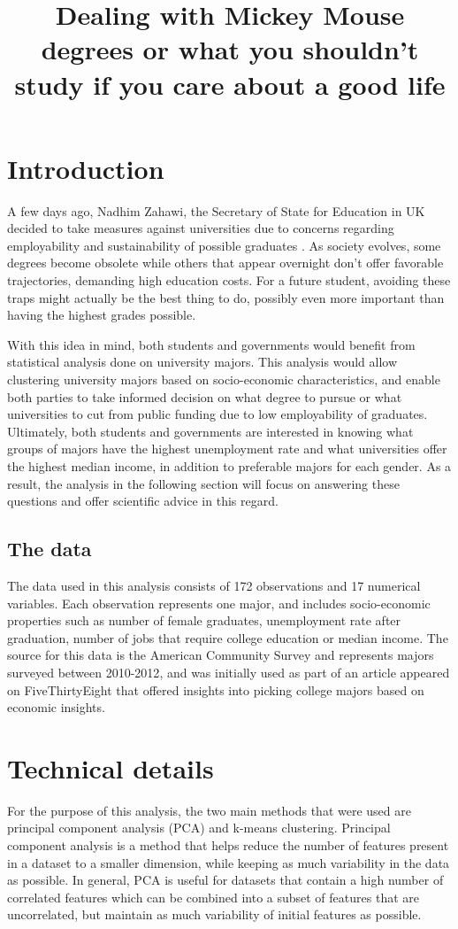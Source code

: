 \documentclass[11pt]{article}
\date{}
\title{Dealing with Mickey Mouse degrees or what you shouldn't study if you care about a good life}
\begin{document}
\newpage
\maketitle

\section*{Introduction}
A few days ago, Nadhim Zahawi, the Secretary of State for Education in UK decided to take measures against universities due to concerns regarding employability and sustainability of possible graduates \cite{dailymail}. As society evolves, some degrees become obsolete while others that appear overnight don't offer favorable trajectories, demanding high education costs. For a future student, avoiding these traps might actually be the best thing to do, possibly even more important than having the highest grades possible. 

With this idea in mind, both students and governments would benefit from statistical analysis done on university majors. This analysis would allow clustering university majors based on socio-economic characteristics, and enable both parties to take informed decision on what degree to pursue or what universities to cut from public funding due to low employability of graduates. Ultimately, both students and governments are interested in knowing what groups of majors have the highest unemployment rate and what universities offer the highest median income, in addition to preferable majors for each gender. As a result, the analysis in the following section will focus on answering these questions and offer scientific advice in this regard.

\subsection*{The data}
The data used in this analysis consists of 172 observations and 17 numerical variables. Each observation represents one major, and includes socio-economic properties such as number of female graduates, unemployment rate after graduation, number of jobs that require college education or median income. The source for this data is the American Community Survey and represents majors surveyed between 2010-2012\cite{acs}, and was initially used as part of an article appeared on FiveThirtyEight \cite{fivethirtyeight} that offered insights into picking college majors based on economic insights.

\section*{Technical details}
For the purpose of this analysis, the two main methods that were used are principal component analysis (PCA) and k-means clustering. Principal component analysis is a method that helps reduce the number of features present in a dataset to a smaller dimension, while keeping as much variability in the data as possible. In general, PCA is useful for datasets that contain a high number of correlated features which can be combined into a subset of features that are uncorrelated, but maintain as much variability of initial features as possible.
\end{document}
